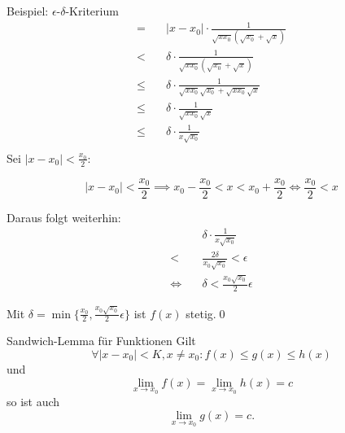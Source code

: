 \documentclass[german]{spicker}
\renewcommand{\abs}[1]{\left| #1 \right|}
\begin{document}
\begin{bonus}{Beispiel: $\epsilon$-$\delta$-Kriterium}
$$\begin{aligned}
            = \quad    & \abs{x-x_0} \cdot \frac{1 }{ \sqrt{x x_0 } \left( \sqrt{x_0} + \sqrt{x} \right) }                                                                        \\
            < \quad    & \delta \cdot \frac{1 }{ \sqrt{x x_0 } \left( \sqrt{x_0} + \sqrt{x} \right) }                                                                             \\
            \leq \quad & \delta \cdot \frac{1 }{ \sqrt{x x_0 } \sqrt{x_0} + \sqrt{x x_0 } \sqrt{x} }                                                                              \\
            \leq \quad & \delta \cdot \frac{1 }{ \sqrt{x x_0 } \sqrt{x} }                                                                                                         \\
            \leq \quad & \delta \cdot \frac{1 }{ x\sqrt{x_0} }                                                                                                                    \\
        \end{aligned}
    $$
    Sei $\abs{x-x_0} < \frac{x_0}{2}$:

    $$\abs{x-x_0} < \frac{x_0}{2} \implies x_0 -\frac{x_0}{2}  < x < x_0 + \frac{x_0}{2}  \iff \frac{x_0}{2} < x$$

    Daraus folgt weiterhin:
    $$
        \begin{aligned}
                       & \delta \cdot \frac{1 }{ x\sqrt{x_0} }       \\
            < \quad    & \frac{2\delta }{ x_0\sqrt{x_0} } < \epsilon \\
            \iff \quad & \delta < \frac{x_0\sqrt{x_0}}{2} \epsilon
        \end{aligned}
    $$

    Mit $\delta = \min\{\frac{x_0}{2}, \frac{x_0\sqrt{x_0}}{2}\epsilon\}$ ist $f(x)$ stetig.\qed
\end{bonus}

\begin{defi}{Sandwich-Lemma für Funktionen}
    Gilt
    $$
        \forall \abs{x-x_0} < K, x\neq x_0 : f(x) \leq g(x) \leq h(x)
    $$
    und
    $$
        \lim_{x\to x_0} f(x) = \lim_{x\to x_0} h(x) = c
    $$
    so ist auch
    $$
        \lim_{x\to x_0} g(x) = c.
    $$
\end{defi}
\end{document}
